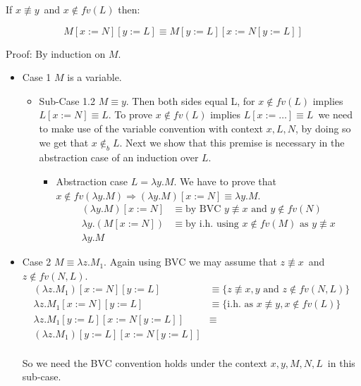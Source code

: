 \documentclass{article}
\newcommand{\lamb}{\ensuremath{\lambda}}
\newcommand{\ninb}{\ensuremath{\not\in_b}}
\newcommand{\lam}{\ensuremath{\lambda}}
\begin{document}
If $x \not\equiv y$\ and $x \not\in fv(L)$ then:

\[ M [x:=N][y:=L] \equiv M[y:=L][x:=N[y:=L]] \]

Proof: By induction on $M$.
\begin{itemize}
\item{Case 1} $M$ is a variable.
  \begin{itemize}
  \item{Sub-Case 1.2} $M \equiv y$. Then both sides equal L, for $x \not\in fv(L)$ implies $L[x:=N]\equiv L$.
    To prove $x \not\in fv(L)$ implies $L[x:=\dots]\equiv L$\ we need to make use of the variable convention with context $x,L,N$, by doing so we get that $x \ninb L$. Next we show that this premise is necessary in the abstraction case of an induction over $L$.

\begin{itemize}
\item Abstraction case $L = \lam y . M$.  We have to prove that $x \not\in fv(\lam y . M) \Rightarrow (\lam y . M)[ x := N] \equiv \lam y . M$.
  \[\begin{array}{ll}
      (\lam y . M)[ x := N] & \equiv \text{by BVC } y \not\equiv x \text{ and } y \not\in fv(N) \\
      \lam y . (M [ x := N]) & \equiv \text{by i.h. using } x \not\in fv(M) \text{ as } y \not\equiv x \\
      \lam y . M
  \end{array}\]
\end{itemize}

  \end{itemize}
\item{Case 2} $M \equiv \lamb z . M_1$. Again using BVC we may assume that $z \not\equiv x$\ and $z \not\in fv(N,L)$.
\[ \begin{array}{rl}
     (\lam z. M_1)[x:=N][y:=L]      & \equiv  \{z \not\equiv x, y \text{ and } z \not\in fv(N,L) \} \\
     \lam z . M_1[x:=N][y:=L]       & \equiv  \{\text{i.h. as } x \not\equiv y, x \not\in fv(L) \} \\
     \lam z . M_1[y:=L][x:=N[y:=L]] & \equiv  \\
     (\lam z . M_1) [y:=L][x:=N[y:=L]] & \\
  \end{array}\]

  So we need the BVC convention holds under the context $x,y,M,N,L$\ in this sub-case.
\end{itemize}
\end{document}
